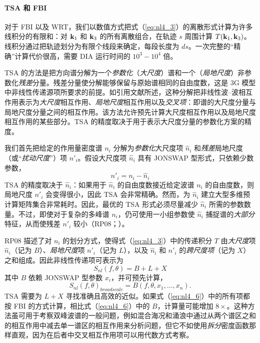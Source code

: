 \paragraph{TSA 和 FBI}

对于 FBI 以及 WRT，我们以数值方式把式（\ref{eq:nl4_3}）的离散形式计算为许多线积分的有限和：对 ${\bf k}_1$ 和 ${\bf k}_3$ 的所有离散组合，在轨迹 $s$ 周围计算 $T({\bf k}_1,{\bf k}_3 )$。线积分通过把轨迹划分为有限个线段来确定，每段长度为 $ds$。一次完整的“精确”计算代价很高，需要 DIA 运行时间的 $10^3-10^4$ 倍。

TSA 的方法是把方向谱分解为一个\textit{参数化}（\textit{大尺度}）谱和一个（\textit{局地尺度}）非参数化\textit{残差}分量。残差分量使分解能够保留与原始谱相同的自由度数，这是 3G 模型中非线性传递源项所要求的前提。如引用文献所述，这种分解把非线性波--波相互作用表示为\textit{大尺度}相互作用、\textit{局地尺度}相互作用以及\textit{交叉项}：即谱的大尺度分量与局地尺度分量之间的相互作用。该方法允许预先计算大尺度相互作用以及局地尺度相互作用的某些部分。TSA 的精度取决于用于表示大尺度分量的参数化方案的精度。

我们首先把给定的作用量密度谱 $n_i$ 分解为\textit{参数化}大尺度项 $\hat{n}_i$ 和\textit{残差}局地尺度（或“\textit{扰动尺度}”）项 $n'_i$。假设大尺度项 $\hat{n}_i$ 具有 JONSWAP 型形式，只依赖少数参数，
\begin{equation}
		n'_i=n_i-\hat{n}_i
\end{equation}			
TSA 的精度取决于 $\hat{n}_i$：如果用于 $\hat{n}_i$ 的自由度数接近给定波谱 $n_i$ 的自由度数，则局地尺度 $n'_i$ 会变得很小，因此 TSA 会非常精确。然而，为 $\hat{n}_i$ 建立大型多维预计算矩阵集合非常耗时。因此，最优的 TSA 形式必须尽量减少 $\hat{n}_i$ 所需的参数数量。不过，即使对于复杂的多峰谱 $n_i$，仍可使用一小组参数使 $\hat{n}_i$ 捕捉谱的\textit{大部分}特征，从而使残差 $n'_i$ 较小（RP08；\cite{art:Perrie2009}）。
 
RP08 描述了对 $n_i$ 的划分方式，使得式（\ref{eq:nl4_3}）中的传递积分 $T$ 由\textit{大尺度}项 $\hat{n}_i$（记为 $B$）、\textit{局地尺度}项 $n'_i$（记为 $L$），以及 $\hat{n}_i$ 和 $n'_i$ 的\textit{跨尺度项}（记为 $X$）之和组成。因此非线性传递项可表示为
\begin{equation}
S_{nl}(f,\theta) = B+L+X \label{eq:nl4_6}
\end{equation}
其中 $B$ 依赖 JONSWAP 型参数 $x_i$，并可预先计算，
\begin{equation}
S_{nl}(f,\theta)_{broadscale} = B(f,\theta,x_1,\ldots,x_n). \label{eq:nl4_7}
\end{equation}
TSA 需要为 $L+X$ 寻找准确且高效的近似。如果式（\ref{eq:nl4_6}）中的所有项都按 FBI 的方式计算，相比式（\ref{eq:nl4_6}）中的 $B$，计算量可能增加 $8\times$。这种方法虽可用于考察双峰波谱的一般问题，例如混合海况和涌浪中通过从两个谱区之和的相互作用中减去单一谱区的相互作用来分析问题，但它不如使用\textit{拆分}密度函数那样直观，因为在后者中交叉相互作用项可以用代数方式考察。


